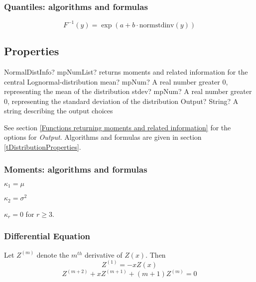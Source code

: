 \subsubsection{Quantiles: algorithms and formulas}

\begin{equation} 
	F^{-1}(y)= \exp(a+b \cdot \text{normstdinv}(y))
\end{equation}




\subsection{Properties}
\label{NormalDistributionProperties}


\begin{mpFunctionsExtract}
	\mpFunctionThree
	{NormalDistInfo? mpNumList? returns moments and related information for the central Lognormal-distribution}
	{mean? mpNum? A real number greater 0, representing the mean of the distribution}
	{stdev? mpNum? A real number greater 0, representing the standard deviation of the distribution}
	{Output? String? A string describing the output choices}
\end{mpFunctionsExtract}

\vspace{0.3cm}

See section \ref{Functions returning moments and related information} for the options for {\itshape\sffamily Output}. Algorithms and formulas are given in section \ref{tDistributionProperties}.




\subsubsection{Moments: algorithms and formulas}
$\kappa_1 = \mu$

$\kappa_2 = \sigma^2$

$\kappa_r = 0$ for $r \geq 3$.

\subsubsection{Differential Equation}
\label{Differential Equation}
Let $Z^{(m)}$ denote the $m^{th}$ derivative of $Z(x)$. Then \citep{abramowitz_handbook_1970}
\begin{equation}
	Z^{(1)} = -x Z(x)
\end{equation}
\begin{equation}
	Z^{(m+2)} +xZ^{(m+1)} + (m+1)Z^{(m)}  = 0
\end{equation}




